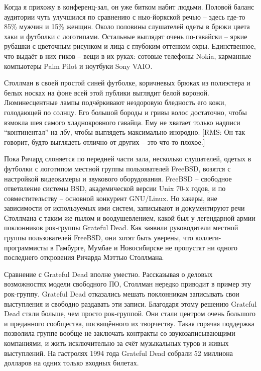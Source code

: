 Когда я прихожу в конференц-зал, он уже битком набит людьми. Половой баланс аудитории чуть улучшился по сравнению с нью-йоркской речью -- здесь где-то 85\% мужчин и 15\% женщин. Около половины слушателей одеты в брюки цвета хаки и футболки с логотипами. Остальные выглядят очень по-гавайски -- яркие рубашки с цветочным рисунком и лица с глубоким оттенком охры. Единственное, что выдаёт в них гиков -- вещи в их руках: сотовые телефоны Nokia, карманные компьютеры Palm Pilot и ноутбуки Sony VAIO.

Столлман в своей простой синей футболке, коричневых брюках из полиэстера и белых носках на фоне всей этой публики выглядит белой вороной. Люминесцентные лампы подчёркивают нездоровую бледность его кожи, голодающей по солнцу.  Его большой бороды и гривы волос достаточно, чтобы взмокла шея самого хладнокровного гавайца. Ему не хватает только надписи \enquote{континентал} на лбу, чтобы выглядеть максимально инородно. [RMS: Он так говорит, будто выглядеть отлично от других -- это что-то плохое.]

Пока Ричард слоняется по передней части зала, несколько слушателей, одетых в футболки с логотипом местной группы пользователей FreeBSD, возятся с настройкой видеокамеры и звукового оборудования. FreeBSD -- свободное ответвление системы BSD, академической версии Unix 70-х годов, и по совместительству -- основной конкурент GNU/Linux. Но хакеры, вне зависимости от используемых ими систем, записывают и документируют речи Столлмана с таким же пылом и воодушевлением, какой был у легендарной армии поклонников рок-группы Grateful Dead. Как заявили руководители местной группы пользователей FreeBSD, они хотят быть уверены, что коллеги-программисты в Гамбурге, Мумбае и Новосибирске не пропустят ни одного последнего откровения Ричарда Мэттью Столлмана.

Сравнение с Grateful Dead вполне уместно. Рассказывая о деловых возможностях модели свободного ПО, Столлман нередко приводит в пример эту рок-группу. Grateful Dead отказались мешать поклонникам записывать свои выступления и свободно раздавать эти записи. Благодаря этому решению Grateful Dead стали больше, чем просто рок-группой. Они стали центром очень большого и преданного сообщества, посвящённого их творчеству. Такая горячая поддержка позволила группе вообще не заключать контракты со звукозаписывающими компаниями, и жить исключительно за счёт музыкальных туров и живых выступлений. На гастролях 1994 года Grateful Dead собрали 52 миллиона долларов на одних только входных билетах. 

